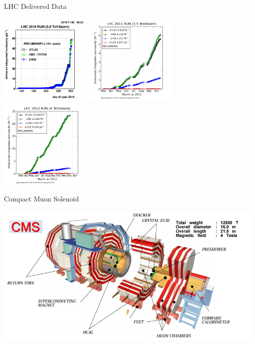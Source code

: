 \begin{frame}{LHC Delivered Data}
\begin{center}
\includegraphics[width=0.33\textwidth]{images/2010_lhc_luminocity.png}
\includegraphics[width=0.33\textwidth]{images/2011_lhc_luminocity.png}
\includegraphics[width=0.33\textwidth]{images/2012_lhc_luminocity.png}
\end{center}
\end{frame}

\begin{frame}{Compact Muon Solenoid}
\begin{center}
\includegraphics[width=0.99\textwidth]{images/CMScollaborationPoster.png}
\end{center}
\end{frame}


